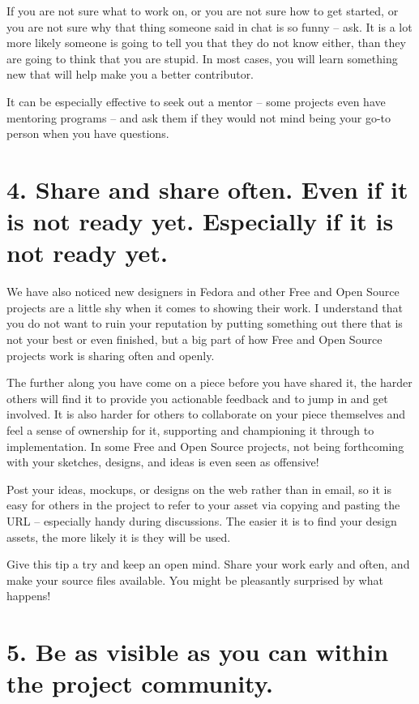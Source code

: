 If you are not sure what to work on, or you are not sure how to get started, or
you are not sure why that thing someone said in chat is so funny -- ask. It is a
lot more likely someone is going to tell you that they do not know either, than
they are going to think that you are stupid. In most cases, you will learn
something new that will help make you a better contributor.

It can be especially effective to seek out a mentor -- some projects even have
mentoring programs -- and ask them if they would not mind being your go-to person when you have questions. 

\section*{4. Share and share often. Even if it is not ready yet. Especially if it
is not ready yet.}

We have also noticed new designers in Fedora and other Free and Open Source projects
are a little shy when it comes to showing their work. I understand that you
do not want to ruin your reputation by putting something out there that is not
your best or even finished, but a big part of how Free and Open Source projects
work is sharing often and openly. 

The further along you have come on a piece before you have shared it, the harder
others will find it to provide you actionable feedback and to jump in and get
involved. It is also harder for others to collaborate on your piece themselves
and feel a sense of ownership for it, supporting and championing it through to
implementation. In some Free and Open Source projects, not being forthcoming with
your sketches, designs, and ideas is even seen as offensive! 

Post your ideas, mockups, or designs on the web rather than in email, so it is
easy for others in the project to refer to your asset via copying and pasting the
URL -- especially handy during discussions. The easier it is to find your design
assets, the more likely it is they will be used. 

Give this tip a try and keep an open mind. Share your work early and often, and
make your source files available. You might be pleasantly surprised by what
happens!

\section*{5. Be as visible as you can within the project community.}

